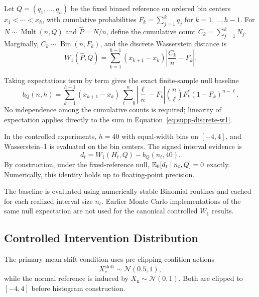 Let $Q=(q_1,\ldots,q_h)$ be the fixed binned reference on ordered bin
centers $x_1<\cdots<x_h$, with cumulative probabilities
$F_k=\sum_{j=1}^{k}q_j$ for $k=1,\ldots,h-1$.
For $N\sim\operatorname{Mult}(n,Q)$ and $\widehat P=N/n$, define the
cumulative count $C_k=\sum_{j=1}^{k}N_j$. Marginally,
$C_k\sim\operatorname{Bin}(n,F_k)$, and the discrete Wasserstein distance is
\begin{equation}
\label{eq:supp-discrete-w1}
W_1(\widehat P,Q)
=
\sum_{k=1}^{h-1}
(x_{k+1}-x_k)
\left|
\frac{C_k}{n}-F_k
\right|.
\end{equation}

Taking expectations term by term gives the exact finite-sample null baseline
\begin{equation}
\label{eq:supp-exact-null}
b_Q(n,h)
=
\sum_{k=1}^{h-1}
(x_{k+1}-x_k)
\sum_{\ell=0}^{n}
\left|
\frac{\ell}{n}-F_k
\right|
\binom{n}{\ell}
F_k^\ell(1-F_k)^{n-\ell}.
\end{equation}
No independence among the cumulative counts is required; linearity of
expectation applies directly to the sum in
Equation~\eqref{eq:supp-discrete-w1}.

In the controlled experiments, $h=40$ with equal-width bins on $[-4,4]$,
and Wasserstein--1 is evaluated on the bin centers. The signed interval
evidence is
\begin{equation}
\label{eq:supp-centered-evidence}
d_t
=
W_1(H_t,Q)-b_Q(n_t,40).
\end{equation}
By construction, under the fixed-reference null,
$\mathbb{E}_0[d_t\mid n_t,Q]=0$ exactly. Numerically, this identity holds up to
floating-point precision.

The baseline is evaluated using numerically stable Binomial routines and
cached for each realized interval size $n_t$. Earlier Monte Carlo
implementations of the same null expectation are not used for the canonical
controlled $W_1$ results.


\subsection{Controlled Intervention Distribution}
\label{sec:supp-rotation-attacks}

The primary mean-shift condition uses pre-clipping coalition actions
\[
X_{\mathrm c}^{\mathrm{shift}}
\sim
\mathcal N(0.5,1),
\]
while the normal reference is induced by
$X_{\mathrm n}\sim\mathcal N(0,1)$.
Both are clipped to $[-4,4]$ before histogram construction.

